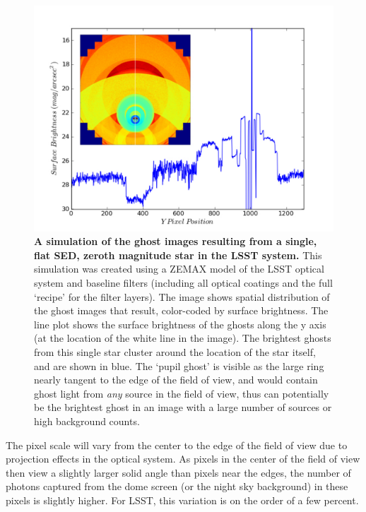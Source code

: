 \documentclass[12pt,preprint]{aastex}
\begin{document}
\begin{figure}[htbp]
\includegraphics[width=6in]{r-bandGhost}
\caption{ {\small
{\bf A simulation of the ghost images resulting from a single, flat
  SED, zeroth magnitude star in the LSST system.} This simulation was
created using a ZEMAX model of the
LSST optical system and baseline filters (including all optical
coatings and the full `recipe' for the filter layers). The image shows
spatial distribution of the ghost images that result, color-coded by
surface brightness. The line plot shows the surface brightness of the
ghosts along the y axis (at the location of the white line in the
image).  The brightest ghosts from this single star cluster around the
location of the star itself, and are shown in blue. The `pupil ghost'
is visible as the large ring nearly tangent to the edge of the field
of view, and would contain ghost light from {\it any} source in the
field of view, thus can potentially be the brightest ghost in an image
with a large number of sources or high background counts. }}
\label{fig:ghosts}
\end{figure}

\label{sec:pixscale}

The pixel scale will vary from the center to the edge of the field of
view due to projection effects in the optical system. As pixels in the
center of the field of view then view a slightly larger solid angle
than pixels near the edges, the number of photons captured from the
dome screen (or the night sky background) in these pixels is slightly
higher. For LSST, this variation is on the order of a few percent.
\end{document}
